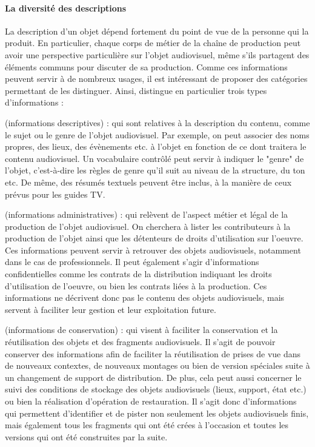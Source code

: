 \paragraph{La diversité des descriptions}
La description d'un objet dépend fortement du point de vue de la personne qui la produit. 
En particulier, chaque corps de métier de la chaîne de production peut avoir une perspective particulière sur l'objet audiovisuel, même s'ils partagent des éléments communs pour discuter de sa production. 
Comme ces informations peuvent servir à de nombreux usages, il est intéressant de proposer des catégories permettant de les distinguer. 
Ainsi, \cite[\S 2:Types of Metadata]{Austerberry2004} distingue en particulier trois types d'informations : 
\begin{liste}
	\item {} (informations descriptives) : qui sont relatives à la description du contenu, comme le sujet ou le genre de l'objet audiovisuel. 
	Par exemple, on peut associer des noms propres, des lieux, des évènements etc. à l'objet en fonction de ce dont traitera le contenu audiovisuel. 
	Un vocabulaire contrôlé peut servir à indiquer le "genre" de l'objet, c'est-à-dire les règles de genre qu'il suit au niveau de la structure, du ton etc.
	De même, des résumés textuels peuvent être inclus, à la manière de ceux prévus pour les guides TV. 

	\item {} (informations administratives) : qui relèvent de l'aspect métier et légal de la production de l'objet audiovisuel. 
	On cherchera à lister les contributeurs à la production de l'objet ainsi que les détenteurs de droits d'utilisation sur l'oeuvre. 
	Ces informations peuvent servir à retrouver des objets audiovisuels, notamment dans le cas de professionnels.
	Il peut également s'agir d'informations confidentielles comme les contrats de la distribution indiquant les droits d'utilisation de l'oeuvre, ou bien les contrats liées à la production. 
	Ces informations ne décrivent donc pas le contenu des objets audiovisuels, mais servent à faciliter leur gestion et leur exploitation future.

	\item {} (informations de conservation) : qui visent à faciliter la conservation et la réutilisation des objets et des fragments audiovisuels. 
	Il s'agit de pouvoir conserver des informations afin de faciliter la réutilisation de prises de vue dans de nouveaux contextes, de nouveaux montages ou bien de version spéciales suite à un changement de support de distribution. 
	De plus, cela peut aussi concerner le suivi des conditions de stockage des objets audiovisuels (lieux, support, état etc.) ou bien la réalisation d'opération de restauration. 
	Il s'agit donc d'informations qui permettent d'identifier et de pister non seulement les objets audiovisuels finis, mais également tous les fragments qui ont été crées à l'occasion et toutes les versions qui ont été construites par la suite.
\end{liste}


